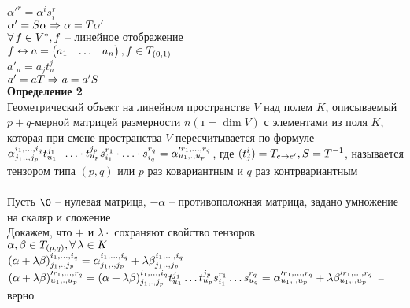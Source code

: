 \documentclass[12pt]{article}
\begin{document}
$\alpha'^r = \alpha^i s^r_i$\\
$\alpha' = S\alpha \Rightarrow \alpha=T\alpha'$\\
$\forall\, f \in V^*, f$ -- линейное отображение\\
$f \leftrightarrow a=\begin{pmatrix}
    a_1 & \ldots & a_n
\end{pmatrix}, f \in T_{(0,1)}$\\
$a'_u = a_j t_u^j$\\
$a' = aT \Rightarrow a=a'S$\\
\textbf{Определение 2}\\
Геометрический объект на линейном пространстве $V$ над полем $K$, описываемый $p+q$-мерной матрицей размерности $n(т = \dim V)$ с элементами из поля $K$, которая при смене пространства $V$ пересчитывается по формуле $\alpha_{j_1, \ldotp, j_p}^{i_1, \ldots, i_q} t_{u_1}^{j_1}\cdot\ldots\cdot t_{u_p}^{j_p} s_{i_1}^{r_1} \cdot \ldots \cdot s_{i_q}^{r_q} = \alpha'^{r_1, \ldots, r_q}_{u_1, \ldotp, u_p}$, где $(t_j^i) = T_{e\rightarrow e'}, S = T^{-1}$, называется тензором типа $(p,q)$ или $p$ раз ковариантным и $q$ раз контрвариантным\\\\
Пусть $\0$ -- нулевая матрица, $-\alpha$ -- противоположная матрица, задано умножение на скаляр и сложение\\
Докажем, что $+$ и $\lambda \cdot$ сохраняют свойство тензоров\\
$\alpha, \beta \in T_{(p,q)}, \forall\, \lambda \in K$\\
$(\alpha + \lambda \beta)_{j_1, \ldotp, j_p}^{i_1, \ldots, i_q} = \alpha_{j_1, \ldotp, j_p}^{i_1, \ldots, i_q} + \lambda\beta_{j_1, \ldotp, j_p}^{i_1, \ldots, i_q} $\\
$(\alpha + \lambda\beta)'^{r_1, \ldots, r_q}_{u_1, \ldotp, u_p} = (\alpha + \lambda \beta)_{j_1, \ldotp, j_p}^{i_1, \ldots, i_q} t_{u_1}^{j_1}\ldots t_{u_p}^{j_p}s_{i_1}^{r_1}\ldots s_{u_q}^{r_q} = \alpha'^{r_1, \ldots, r_q}_{u_1, \ldotp, u_p} + \lambda\beta'^{r_1, \ldots, r_q}_{u_1, \ldotp, u_p}$ -- верно
\end{document}
